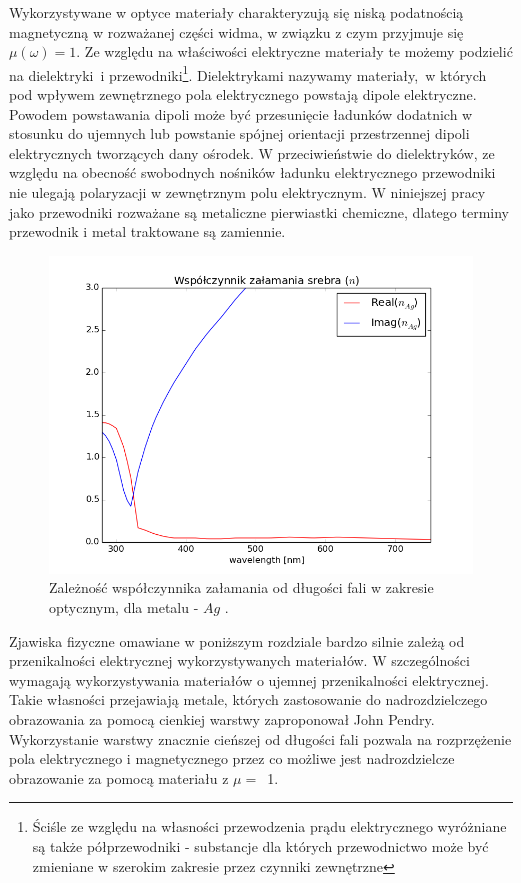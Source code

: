 Wykorzystywane w optyce materiały charakteryzują się niską podatnością magnetyczną w rozważanej części widma, w związku z czym przyjmuje się $\mu(\omega)=1$. Ze względu na właściwości elektryczne  materiały te możemy  podzielić na dielektryki~i przewodniki\footnote{Ściśle ze względu na własności przewodzenia prądu elektrycznego wyróżniane są także półprzewodniki - substancje dla których przewodnictwo może być zmieniane w szerokim zakresie przez czynniki zewnętrzne}. Dielektrykami nazywamy materiały,~w których pod wpływem zewnętrznego pola elektrycznego powstają dipole elektryczne. Powodem powstawania dipoli może być przesunięcie ładunków dodatnich w stosunku do ujemnych lub powstanie spójnej orientacji przestrzennej dipoli elektrycznych tworzących dany ośrodek. W przeciwieństwie do dielektryków, ze względu na obecność swobodnych nośników ładunku elektrycznego przewodniki nie ulegają polaryzacji w zewnętrznym polu elektrycznym. W niniejszej pracy jako przewodniki rozważane są metaliczne pierwiastki chemiczne, dlatego terminy przewodnik i metal traktowane są zamiennie.

\begin{figure}[tb]
	\includegraphics[width=\textwidth]{images/agn.png}
	\caption{Zależność współczynnika załamania od długości fali w zakresie optycznym, dla metalu - $Ag$ \cite{PhysRevB.6.4370}.  }
	\label{fig:agn}
\end{figure}
Zjawiska fizyczne omawiane w poniższym rozdziale bardzo silnie zależą od przenikalności elektrycznej wykorzystywanych materiałów. W szczególności wymagają wykorzystywania materiałów o ujemnej przenikalności elektrycznej. Takie własności przejawiają metale, których zastosowanie do nadrozdzielczego obrazowania za pomocą cienkiej warstwy zaproponował John Pendry. Wykorzystanie warstwy znacznie cieńszej od długości fali pozwala na rozprzężenie pola elektrycznego i magnetycznego przez co możliwe jest nadrozdzielcze obrazowanie za pomocą materiału z $\mu=$~1\cite{PhysRevLett.85.3966}.

